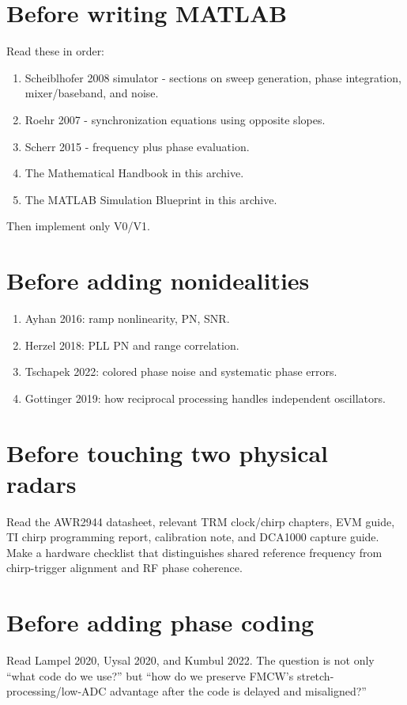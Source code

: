 \documentclass[11pt]{article}
\begin{document}
\section{Before writing MATLAB}
Read these in order:
\begin{enumerate}
\item Scheiblhofer 2008 simulator - sections on sweep generation, phase integration, mixer/baseband, and noise.
\item Roehr 2007 - synchronization equations using opposite slopes.
\item Scherr 2015 - frequency plus phase evaluation.
\item The Mathematical Handbook in this archive.
\item The MATLAB Simulation Blueprint in this archive.
\end{enumerate}
Then implement only V0/V1.

\section{Before adding nonidealities}
\begin{enumerate}
\item Ayhan 2016: ramp nonlinearity, PN, SNR.
\item Herzel 2018: PLL PN and range correlation.
\item Tschapek 2022: colored phase noise and systematic phase errors.
\item Gottinger 2019: how reciprocal processing handles independent oscillators.
\end{enumerate}

\section{Before touching two physical radars}
Read the AWR2944 datasheet, relevant TRM clock/chirp chapters, EVM guide, TI chirp programming report, calibration note, and DCA1000 capture guide. Make a hardware checklist that distinguishes shared reference frequency from chirp-trigger alignment and RF phase coherence.

\section{Before adding phase coding}
Read Lampel 2020, Uysal 2020, and Kumbul 2022. The question is not only ``what code do we use?'' but ``how do we preserve FMCW's stretch-processing/low-ADC advantage after the code is delayed and misaligned?''
\end{document}
